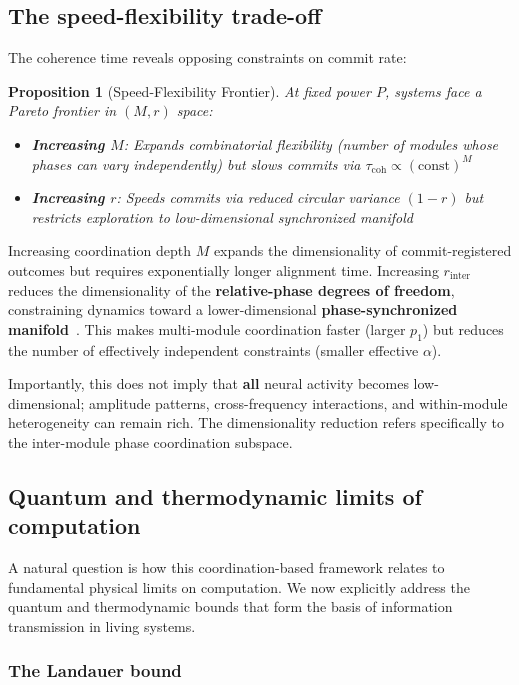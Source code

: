 \documentclass[12pt]{article}
\newtheorem{proposition}{Proposition}
\begin{document}
\subsection{The speed-flexibility trade-off}

The coherence time reveals opposing constraints on commit rate:

\begin{proposition}[Speed-Flexibility Frontier]\label{prop:tradeoff}
At fixed power $P$, systems face a Pareto frontier in $(M,r)$ space:
\begin{itemize}
\item \textbf{Increasing $M$}: Expands combinatorial flexibility (number of modules whose phases can vary independently) but slows commits via $\tau_{\mathrm{coh}} \propto (\mathrm{const})^{M}$
\item \textbf{Increasing $r$}: Speeds commits via reduced circular variance $(1-r)$ but restricts exploration to low-dimensional synchronized manifold
\end{itemize}
\end{proposition}

Increasing coordination depth $M$ expands the dimensionality of commit-registered outcomes but requires exponentially longer alignment time. Increasing $r_{\mathrm{inter}}$ reduces the dimensionality of the \textbf{relative-phase degrees of freedom}, constraining dynamics toward a lower-dimensional \textbf{phase-synchronized manifold}~\cite{strogatz2000,ott2008}. This makes multi-module coordination faster (larger $p_1$) but reduces the number of effectively independent constraints (smaller effective $\alpha$).

Importantly, this does not imply that \textbf{all} neural activity becomes low-dimensional; amplitude patterns, cross-frequency interactions, and within-module heterogeneity can remain rich. The dimensionality reduction refers specifically to the inter-module phase coordination subspace.

\subsection{Quantum and thermodynamic limits of computation}

A natural question is how this coordination-based framework relates to fundamental physical limits on computation. We now explicitly address the quantum and thermodynamic bounds that form the basis of information transmission in living systems.

\subsubsection{The Landauer bound}
\end{document}
